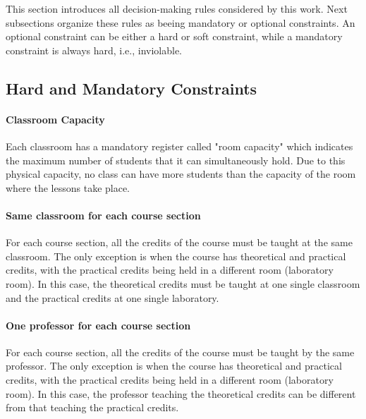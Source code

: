 This section introduces all decision-making rules considered by this work. Next subsections organize these rules as beeing mandatory or optional constraints. An optional constraint can be either a hard or soft constraint, while a mandatory constraint is always hard, i.e., inviolable.


\subsection{Hard and Mandatory Constraints}
\label{sec:mandatory}


\paragraph{Classroom Capacity}
\label{constrroomcap}

Each classroom has a mandatory register called "room capacity" which indicates the maximum number of students that it can simultaneously hold. Due to this physical capacity, no class can have more students than the capacity of the room where the lessons take place.


\paragraph{Same classroom for each course section}
\label{constroneroom}

For each course section, all the credits of the course must be taught at the same classroom. The only exception is when the course has theoretical and practical credits, with the practical credits being held in a different room (laboratory room). In this case, the theoretical credits must be taught at one single classroom and the practical credits at one single laboratory.


\paragraph{One professor for each course section}
\label{constroneprof}

For each course section, all the credits of the course must be taught by the same professor. The only exception is when the course has theoretical and practical credits, with the practical credits being held in a different room (laboratory room). In this case, the professor teaching the theoretical credits can be different from that teaching the practical credits.


